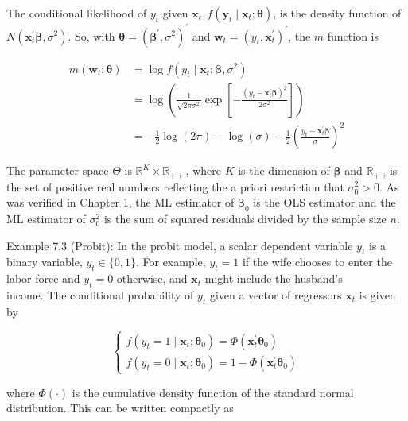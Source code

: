 \documentclass[10pt]{article}
\begin{document}
The conditional likelihood of $y_{t}$ given $\mathbf{x}_{t}, f\left(\mathbf{y}_{t} \mid \mathbf{x}_{t} ; \boldsymbol{\theta}\right)$, is the density function of $N\left(\mathbf{x}_{t}^{\prime} \boldsymbol{\beta}, \sigma^{2}\right)$. So, with $\boldsymbol{\theta}=\left(\boldsymbol{\beta}^{\prime}, \sigma^{2}\right)^{\prime}$ and $\mathbf{w}_{t}=\left(y_{t}, \mathbf{x}_{t}^{\prime}\right)^{\prime}$, the $m$ function is


\begin{align*}
m\left(\mathbf{w}_{t} ; \boldsymbol{\theta}\right) & =\log f\left(y_{t} \mid \mathbf{x}_{t} ; \boldsymbol{\beta}, \sigma^{2}\right) \\
& =\log \left(\frac{1}{\sqrt{2 \pi \sigma^{2}}} \exp \left[-\frac{\left(y_{t}-\mathbf{x}_{t}^{\prime} \boldsymbol{\beta}\right)^{2}}{2 \sigma^{2}}\right]\right) \\
& =-\frac{1}{2} \log (2 \pi)-\log (\sigma)-\frac{1}{2}\left(\frac{y_{t}-\mathbf{x}_{t}^{\prime} \boldsymbol{\beta}}{\sigma}\right)^{2} \tag{7.1.13}
\end{align*}


The parameter space $\Theta$ is $\mathbb{R}^{K} \times \mathbb{R}_{++}$, where $K$ is the dimension of $\boldsymbol{\beta}$ and $\mathbb{R}_{++}$is the set of positive real numbers reflecting the a priori restriction that $\sigma_{0}^{2}>0$. As was verified in Chapter 1, the ML estimator of $\boldsymbol{\beta}_{0}$ is the OLS estimator and the ML estimator of $\sigma_{0}^{2}$ is the sum of squared residuals divided by the sample size $n$.

Example 7.3 (Probit): In the probit model, a scalar dependent variable $y_{t}$ is a binary variable, $y_{t} \in\{0,1\}$. For example, $y_{t}=1$ if the wife chooses to enter the labor force and $y_{t}=0$ otherwise, and $\mathbf{x}_{t}$ might include the husband's\\
income. The conditional probability of $y_{t}$ given a vector of regressors $\mathbf{x}_{t}$ is given by

\[
\left\{\begin{array}{l}
f\left(y_{t}=1 \mid \mathbf{x}_{t} ; \boldsymbol{\theta}_{0}\right)=\Phi\left(\mathbf{x}_{t}^{\prime} \boldsymbol{\theta}_{0}\right)  \tag{7.1.14}\\
f\left(y_{t}=0 \mid \mathbf{x}_{t} ; \boldsymbol{\theta}_{0}\right)=1-\Phi\left(\mathbf{x}_{t}^{\prime} \boldsymbol{\theta}_{0}\right)
\end{array}\right.
\]

where $\Phi(\cdot)$ is the cumulative density function of the standard normal distribution. This can be written compactly as
\end{document}
